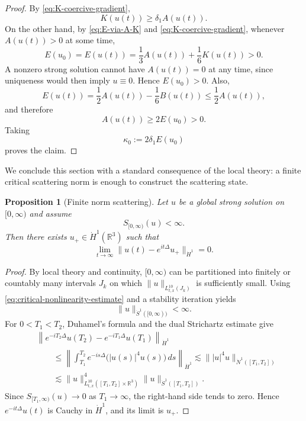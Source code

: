 \documentclass[smallextended,envcountsect,nospthms]{svjour3}
\numberwithin{equation}{section}
\theoremstyle{spbreak}
\newtheorem{proposition}[theorem]{Proposition}
\theoremstyle{spdefbreak}
\theoremstyle{spdefbreak}
\newcommand{\R}{\mathbb R}
\newcommand{\Nd}{\dot N^1}
\newcommand{\Sd}{\dot S^1}
\begin{document}
\begin{proof}
By \eqref{eq:K-coercive-gradient},
\begin{equation*}
  K(u(t))\ge\delta_1A(u(t)).
\end{equation*}
On the other hand, by \eqref{eq:E-via-A-K} and \eqref{eq:K-coercive-gradient}, whenever $A(u(t))>0$ at some time,
\begin{equation*}
  E(u_0)=E(u(t))=\frac13A(u(t))+\frac16K(u(t))>0.
\end{equation*}
A nonzero strong solution cannot have $A(u(t))=0$ at any time, since uniqueness would then imply $u\equiv0$. Hence $E(u_0)>0$. Also,
\begin{equation*}
  E(u(t))=\frac12A(u(t))-\frac16B(u(t))\le\frac12A(u(t)),
\end{equation*}
and therefore
\begin{equation*}
  A(u(t))\ge2E(u_0)>0.
\end{equation*}
Taking
\begin{equation*}
  \kappa_0:=2\delta_1E(u_0)
\end{equation*}
proves the claim.
\end{proof}

We conclude this section with a standard consequence of the local theory: a finite critical scattering norm is enough to construct the scattering state.

\begin{proposition}[Finite norm scattering]\label{prop:finite-S-scattering}
Let $u$ be a global strong solution on $[0,\infty)$ and assume
\begin{equation*}
  S_{[0,\infty)}(u)<\infty.
\end{equation*}
Then there exists $u_+\in\dot H^1(\R^3)$ such that
\begin{equation*}
  \lim_{t\to\infty}\|u(t)-e^{it\Delta}u_+\|_{\dot H^1}=0.
\end{equation*}
\end{proposition}

\begin{proof}
By local theory and continuity, $[0,\infty)$ can be partitioned into finitely or countably many intervals $J_k$ on which $\|u\|_{L_{t,x}^{10}(J_k)}$ is sufficiently small. Using \eqref{eq:critical-nonlinearity-estimate} and a stability iteration yields
\begin{equation*}
  \|u\|_{\Sd([0,\infty))}<\infty.
\end{equation*}
For $0<T_1<T_2$, Duhamel's formula and the dual Strichartz estimate give
\begin{align*}
  &\left\|e^{-iT_2\Delta}u(T_2)-e^{-iT_1\Delta}u(T_1)\right\|_{\dot H^1}\\
  &\qquad\le
  \left\|\int_{T_1}^{T_2}e^{-is\Delta}\bigl(|u(s)|^4u(s)\bigr)\,ds\right\|_{\dot H^1}
  \lesssim \||u|^4u\|_{\Nd([T_1,T_2])}\\
  &\qquad\lesssim
  \|u\|_{L_{t,x}^{10}([T_1,T_2]\times\R^3)}^4
  \|u\|_{\Sd([T_1,T_2])}.
\end{align*}
Since $S_{[T_1,\infty)}(u)\to0$ as $T_1\to\infty$, the right-hand side tends to zero. Hence $e^{-it\Delta}u(t)$ is Cauchy in $\dot H^1$, and its limit is $u_+$.
\end{proof}
\end{document}
